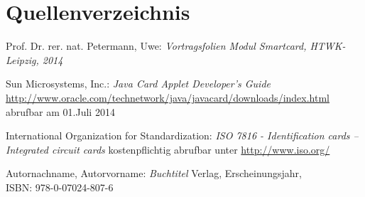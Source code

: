 \documentclass[a4paper,12pt]{scrartcl}
\begin{document}
\section{Quellenverzeichnis}
\label{sec:6}
\renewcommand\refname{Quellenverzeichnis}
\begin{thebibliography}{999}

Prof. Dr. rer. nat. Petermann, Uwe: {\sl   Vortragsfolien Modul Smartcard, HTWK-Leipzig, 2014}

Sun Microsystems, Inc.:  {\sl Java Card Applet Developer's Guide}\\
\url{http://www.oracle.com/technetwork/java/javacard/downloads/index.html}\\
abrufbar am 01.Juli 2014

International Organization for Standardization: {\sl ISO 7816 - Identification cards -- Integrated circuit cards}
kostenpflichtig abrufbar unter \url{http://www.iso.org/}

Autornachname, Autorvorname:  {\sl Buchtitel} Verlag, Erscheinungsjahr,
\\ISBN:  978-0-07024-807-6




\end{thebibliography}
\end{document}
